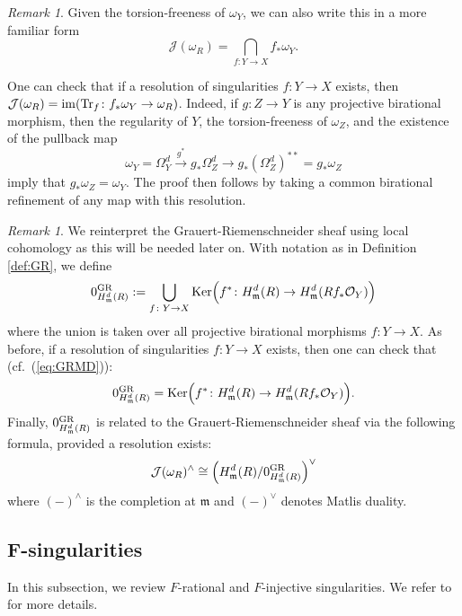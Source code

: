 \documentclass[letterpaper,11pt]{amsart}
\theoremstyle{plain}
\theoremstyle{definition}
\theoremstyle{remark}
\newtheorem{rmk}[thm]{Remark}
\def\cO{\mathcal{O}}
\def\J{\mathcal{J}}
\def\m{\mathfrak{m}} %
\begin{document}
\begin{rmk}
Given the torsion-freeness of $\omega_Y$, we can also write this in a more familiar form \[\J(\omega_R) = \bigcap_{f \colon Y \to X} f_*\omega_Y.\]
\end{rmk}

One can check that if a resolution of singularities $f \colon Y \to X$ exists, then $\J(\omega_R) = {\rm im}({\rm Tr}_f \colon f_*\omega_Y \to \omega_R)$. Indeed, if $g \colon Z \to Y$ is any projective birational morphism, then the regularity of $Y$, the torsion-freeness of $\omega_Z$, and the existence of the pullback map \[
\omega_Y = \Omega^d_Y \xrightarrow{g^*} g_*\Omega^d_Z \to g_*(\Omega^d_Z)^{**} = g_*\omega_Z
\]
imply that $g_*\omega_Z = \omega_Y$. The proof then follows by taking a common birational refinement of any map with this resolution.

\begin{rmk}
We reinterpret the Grauert-Riemenschneider sheaf using local cohomology as this will be needed later on. With notation as in Definition \ref{def:GR}, we define
\[
0^{\rm GR}_{H^d_\m(R)} := \bigcup_{f \colon Y \to X} {\rm Ker}\Big(f^* \colon H^d_{\m}(R) \to H^d_{\m}(Rf_*\cO_Y)\Big)
\]
where the union is taken over all projective birational morphisms $f \colon Y \to X$. As before, if a resolution of singularities $f \colon Y \to X$ exists, then one can check that (cf.\ (\ref{eq:GRMD})):
\[
0^{\rm GR}_{H^d_\m(R)} = {\rm Ker}\Big(f^* \colon H^d_{\m}(R) \to H^d_{\m}(Rf_*\cO_Y)\Big).
\]
Finally, $0^{\rm GR}_{H^d_\m(R)}$ is related to the Grauert-Riemenschneider sheaf via the following formula, provided a resolution exists:
\begin{equation} \label{eq:GRMD}
\J(\omega_R)^{\wedge} \cong \Big(H^d_\m(R)/0^{\rm GR}_{H^d_\m(R)} \Big)^\vee
\end{equation}
where $(-)^{\wedge}$ is the completion at $\m$ and  $(-)^{\vee}$ denotes Matlis duality. 
\end{rmk}

\subsection{F-singularities}

In this subsection, we review $F$-rational and $F$-injective  singularities. We refer to \cite{SchwedeSmith_FrobeniusSingularities} for more details.
\end{document}
